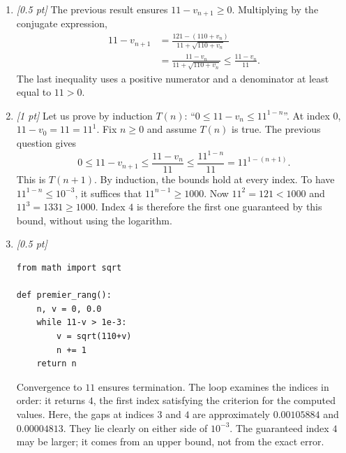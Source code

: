 \begin{enumerate}
\item \textit{[0.5 pt]} The previous result ensures $11-v_{n+1}\ge0$. Multiplying by the conjugate expression,
\[\begin{aligned}11-v_{n+1}&=\frac{121-(110+v_n)}{11+\sqrt{110+v_n}}\\&=\frac{11-v_n}{11+\sqrt{110+v_n}}\le\frac{11-v_n}{11}.\end{aligned}\]
The last inequality uses a positive numerator and a denominator at least equal to $11>0$.

\item \textit{[1 pt]} Let us prove by induction $T(n)$: ``$0\le 11-v_n\le 11^{1-n}$''.
At index $0$, $11-v_0=11=11^1$. Fix $n\ge0$ and assume $T(n)$ is true. The previous question gives
\[0\le 11-v_{n+1}\le\frac{11-v_n}{11}\le\frac{11^{1-n}}{11}=11^{1-(n+1)}.\]
This is $T(n+1)$. By induction, the bounds hold at every index.
To have $11^{1-n}\le10^{-3}$, it suffices that $11^{n-1}\ge1000$.
Now $11^{2}=121<1000$ and $11^{3}=1331\ge1000$. Index $4$ is therefore the first one guaranteed by this bound, without using the logarithm.


\item \textit{[0.5 pt]} 
\begin{lstlisting}
from math import sqrt

def premier_rang():
    n, v = 0, 0.0
    while 11-v > 1e-3:
        v = sqrt(110+v)
        n += 1
    return n
\end{lstlisting}
Convergence to $11$ ensures termination. The loop examines the indices in order: it returns $4$, the first index satisfying the criterion for the computed values. Here, the gaps at indices $3$ and $4$ are approximately $\num{0,00105884}$ and $\num{0,00004813}$. They lie clearly on either side of $10^{-3}$. The guaranteed index $4$ may be larger; it comes from an upper bound, not from the exact error.

\end{enumerate}

